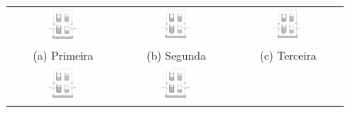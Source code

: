 \begin{figure}[H]
	\centering
\begin{tabular}{ccc}
	\includegraphics[width=0.3\textwidth,keepaspectratio]{img/4tank.png} &
	\includegraphics[width=0.3\textwidth,keepaspectratio]{img/4tank.png} &
	\includegraphics[width=0.3\textwidth,keepaspectratio]{img/4tank.png} \\
	(a) Primeira &
	(b) Segunda &
	(c) Terceira \\
	\includegraphics[width=0.3\textwidth,keepaspectratio]{img/4tank.png} &
	\includegraphics[width=0.3\textwidth,keepaspectratio]{img/4tank.png} &

\end{tabular}
\end{figure}
